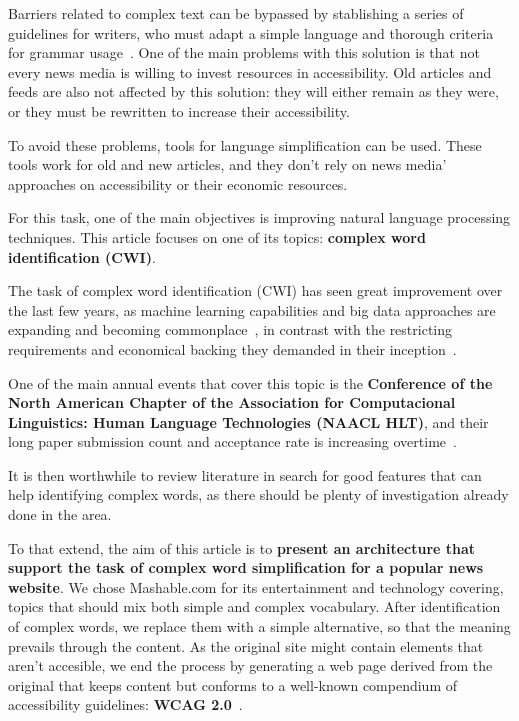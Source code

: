 \documentclass[11pt,a4paper]{article}
\begin{document}
Barriers related to complex text can be bypassed by stablishing a series of guidelines for writers, who must adapt a simple language and thorough criteria for grammar usage~\cite{freyhoff1998make}. One of the main problems with this solution is that not every news media is willing to invest resources in accessibility. Old articles and feeds are also not affected by this solution: they will either remain as they were, or they must be rewritten to increase their accessibility.

To avoid these problems, tools for language simplification can be used. These tools work for old and new articles, and they don’t rely on news media’ approaches on accessibility or their economic resources.

For this task, one of the main objectives is improving natural language processing techniques. This article focuses on one of its topics: \textbf{complex word identification (CWI)}.

The task of complex word identification (CWI) has seen great improvement over the last few years, as machine learning capabilities and big data approaches are expanding and becoming commonplace~\cite{lohr2012age}, in contrast with the restricting requirements and economical backing they demanded in their inception~\cite{cox1997managing}.

One of the main annual events that cover this topic is the \textbf{Conference of the North American Chapter of the Association for Computacional Linguistics: Human Language Technologies (NAACL HLT)}, and their long paper submission count and acceptance rate is increasing overtime~\cite{naaclacc}.

It is then worthwhile to review literature in search for good features that can help identifying complex words, as there should be plenty of investigation already done in the area.

To that extend, the aim of this article is to \textbf{present an architecture that support the task of complex word simplification for a popular news website}. We chose Mashable.com for its entertainment and technology covering, topics that should mix both simple and complex vocabulary. After identification of complex words, we replace them with a simple alternative, so that the meaning prevails through the content. As the original site might contain elements that aren't accesible, we end the process by generating a web page derived from the original that keeps content but conforms to a well-known compendium of accessibility guidelines: \textbf{WCAG 2.0}~\cite{caldwell2008web}.
\end{document}
